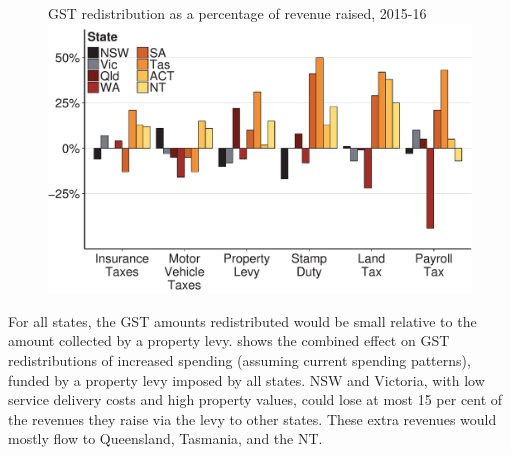 \documentclass[twoside,english]{grattanBudgetRepairb5portrait}
\begin{document}
\begin{figure}
%
{GST redistribution as a percentage of revenue raised, 2015-16}
\includegraphics[width=1.0\columnwidth]{Property-taxes/atlas/figure/Figure6-1.pdf}

\end{figure}

For all states, the GST amounts redistributed would be small relative to the amount collected by a property levy.  shows the combined effect on GST redistributions of increased spending (assuming current spending patterns), funded by a property levy imposed by all states. NSW and Victoria, with low service delivery costs and high property values, could lose at most 15 per cent of the revenues they raise via the levy to other states. These extra revenues would mostly flow to Queensland, Tasmania, and the NT\@.
\end{document}
